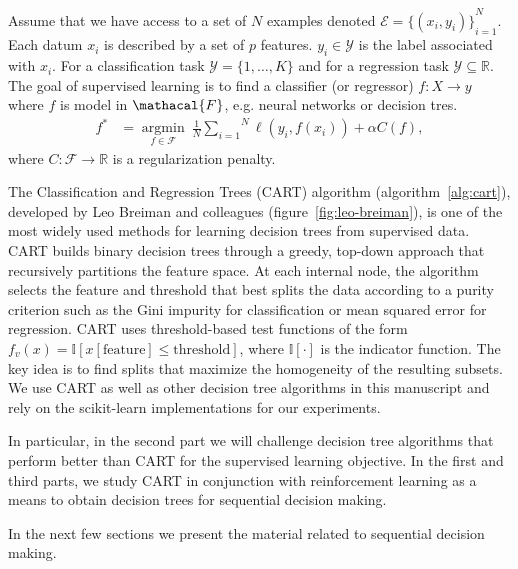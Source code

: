 \begin{definition}\label{def:sl}
    Assume that we have access to a set of $N$ examples denoted $\mathcal{E} = {\{(x_i, y_i)\}}_{i=1}^N$. Each datum $x_i$ is described by a set of $p$ features. $y_i \in {\mathcal Y}$ is the label associated with $x_i$.
    For a classification task $\mathcal{Y}=\{1,\ldots,K\}$ and for a regression task $\mathcal{Y}\subseteq \mathbb{R}$.
    The goal of supervised learning is to find a classifier (or regressor) $f:X \rightarrow  y$ where $f$ is model in $\mathacal{F}$, e.g. neural networks or decision tres.
    \begin{align}
        f^* &= \underset{f \in \mathcal{F}}{\operatorname{argmin}}\ \frac{1}{N}\overset{N}{\underset{i=1}{\sum}}{\ell}(y_i, f(x_i)) + \alpha C(f),
        \label{eq:suplearning}
    \end{align}
    where $C: \mathcal{F} \rightarrow \mathbb{R}$ is a regularization penalty.
    \end{definition}

The Classification and Regression Trees (CART) algorithm \cite{breiman1984classification} (algorithm~\ref{alg:cart}), developed by Leo Breiman and colleagues (figure~\ref{fig:leo-breiman}), is one of the most widely used methods for learning decision trees from supervised data.
CART builds binary decision trees through a greedy, top-down approach that recursively partitions the feature space. 
At each internal node, the algorithm selects the feature and threshold that best splits the data according to a purity criterion such as the Gini impurity for classification or mean squared error for regression.
CART uses threshold-based test functions of the form $f_v(x) = \mathbb{I}[x[\text{feature}] \leq \text{threshold}]$, where $\mathbb{I}[\cdot]$ is the indicator function. 
The key idea is to find splits that maximize the homogeneity of the resulting subsets. 
We use CART as well as other decision tree algorithms in this manuscript and rely on the scikit-learn implementations \cite{scikit-learn} for our experiments.

In particular, in the second part we will challenge decision tree algorithms that perform better than CART for the supervised learning objective.
In the first and third parts, we study CART in conjunction with reinforcement learning as a means to obtain decision trees for sequential decision making.

In the next few sections we present the material related to sequential decision making.

